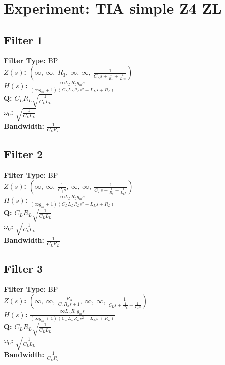 \documentclass{article}
\begin{document}
        \section*{Experiment: TIA simple Z4 ZL}
\subsection*{Filter 1}
\textbf{Filter Type:} BP \\ 
\textbf{$Z(s)$:} $\left( \infty, \  \infty, \  R_{3}, \  \infty, \  \infty, \  \frac{1}{C_{L} s + \frac{1}{R_{L}} + \frac{1}{L_{L} s}}\right)$ \\ 
\textbf{$H(s)$:} $\frac{\infty L_{L} R_{L} g_{m} s}{\left(\infty g_{m} + 1\right) \left(C_{L} L_{L} R_{L} s^{2} + L_{L} s + R_{L}\right)}$ \\ 
\textbf{Q:} $C_{L} R_{L} \sqrt{\frac{1}{C_{L} L_{L}}}$ \\ 
\textbf{$\omega_0$:} $\sqrt{\frac{1}{C_{L} L_{L}}}$ \\ 
\textbf{Bandwidth:} $\frac{1}{C_{L} R_{L}}$ \\ 
\subsection*{Filter 2}
\textbf{Filter Type:} BP \\ 
\textbf{$Z(s)$:} $\left( \infty, \  \infty, \  \frac{1}{C_{3} s}, \  \infty, \  \infty, \  \frac{1}{C_{L} s + \frac{1}{R_{L}} + \frac{1}{L_{L} s}}\right)$ \\ 
\textbf{$H(s)$:} $\frac{\infty L_{L} R_{L} g_{m} s}{\left(\infty g_{m} + 1\right) \left(C_{L} L_{L} R_{L} s^{2} + L_{L} s + R_{L}\right)}$ \\ 
\textbf{Q:} $C_{L} R_{L} \sqrt{\frac{1}{C_{L} L_{L}}}$ \\ 
\textbf{$\omega_0$:} $\sqrt{\frac{1}{C_{L} L_{L}}}$ \\ 
\textbf{Bandwidth:} $\frac{1}{C_{L} R_{L}}$ \\ 
\subsection*{Filter 3}
\textbf{Filter Type:} BP \\ 
\textbf{$Z(s)$:} $\left( \infty, \  \infty, \  \frac{R_{3}}{C_{3} R_{3} s + 1}, \  \infty, \  \infty, \  \frac{1}{C_{L} s + \frac{1}{R_{L}} + \frac{1}{L_{L} s}}\right)$ \\ 
\textbf{$H(s)$:} $\frac{\infty L_{L} R_{L} g_{m} s}{\left(\infty g_{m} + 1\right) \left(C_{L} L_{L} R_{L} s^{2} + L_{L} s + R_{L}\right)}$ \\ 
\textbf{Q:} $C_{L} R_{L} \sqrt{\frac{1}{C_{L} L_{L}}}$ \\ 
\textbf{$\omega_0$:} $\sqrt{\frac{1}{C_{L} L_{L}}}$ \\ 
\textbf{Bandwidth:} $\frac{1}{C_{L} R_{L}}$ \\ 
\end{document}
